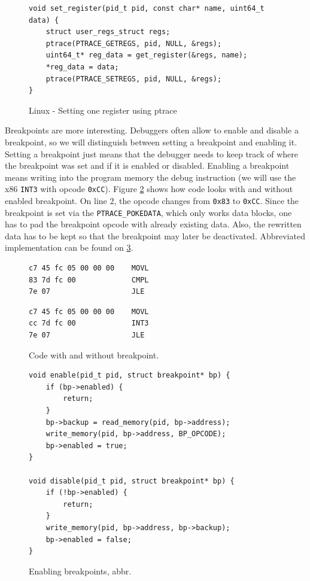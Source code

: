 \begin{figure}\label{fig:set-register}
    \begin{verbatim}
void set_register(pid_t pid, const char* name, uint64_t data) {
    struct user_regs_struct regs;
    ptrace(PTRACE_GETREGS, pid, NULL, &regs);
    uint64_t* reg_data = get_register(&regs, name);
    *reg_data = data;
    ptrace(PTRACE_SETREGS, pid, NULL, &regs);
}
    \end{verbatim}
    \caption{Linux - Setting one register using ptrace}
\end{figure}

Breakpoints are more interesting. Debuggers often allow to enable and disable a
breakpoint, so we will distinguish between setting a breakpoint and enabling
it. Setting a breakpoint just means that the debugger needs to keep track of
where the breakpoint was set and if it is enabled or disabled. Enabling a
breakpoint means writing into the program memory the debug instruction (we will
use the x86 \texttt{INT3} with opcode \texttt{0xCC}). Figure
\ref{fig:with-and-without-bp} shows how code looks with and without enabled
breakpoint. On line $2$, the opcode changes from \texttt{0x83} to
\texttt{0xCC}. Since the breakpoint is set via the \texttt{PTRACE\_POKEDATA},
which only works data blocks, one has to pad the breakpoint opcode with already
existing data. Also, the rewritten data has to be kept so that the breakpoint
may later be deactivated. Abbreviated implementation can be found on
\ref{fig:breakpoint-enable}.

\begin{figure}\label{fig:with-and-without-bp}
    \begin{minipage}{0.45\textwidth}
        \begin{lstlisting}
c7 45 fc 05 00 00 00 	MOVL
83 7d fc 00          	CMPL
7e 07                	JLE
        \end{lstlisting}
    \end{minipage}
    \begin{minipage}{0.45\textwidth}
        \begin{lstlisting}
c7 45 fc 05 00 00 00 	MOVL
cc 7d fc 00          	INT3
7e 07                	JLE
        \end{lstlisting}
    \end{minipage}
    \caption{Code with and without breakpoint.}
\end{figure}

\begin{figure}\label{fig:breakpoint-enable}
    \begin{verbatim}
void enable(pid_t pid, struct breakpoint* bp) {
    if (bp->enabled) {
        return;
    }
    bp->backup = read_memory(pid, bp->address);
    write_memory(pid, bp->address, BP_OPCODE);
    bp->enabled = true;
}

void disable(pid_t pid, struct breakpoint* bp) {
    if (!bp->enabled) {
        return;
    }
    write_memory(pid, bp->address, bp->backup);
    bp->enabled = false;
}
    \end{verbatim}
    \caption{Enabling breakpoints, abbr.}
\end{figure}

